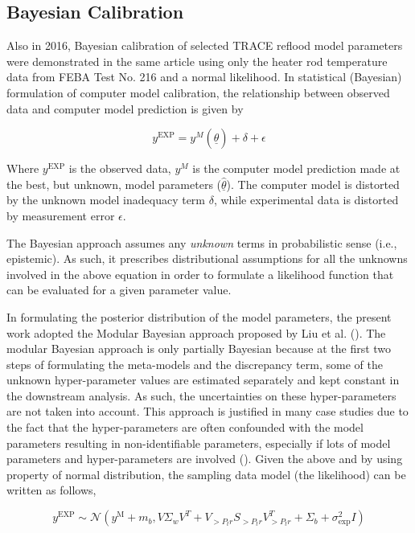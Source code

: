 \documentclass[11pt,titlepage]{article}
\begin{document}
\subsection{Bayesian Calibration}

Also in 2016, Bayesian calibration of selected TRACE reflood model parameters
were demonstrated in the same article \cite{Wicaksono2016} using only the heater 
rod temperature data from FEBA Test No. 216 and a normal likelihood. 
In statistical (Bayesian) formulation of computer model calibration, 
the relationship between observed data and computer model prediction is 
given by

\begin{equation}
	y^{\text{EXP}} = y^M (\underline{\hat{\theta}})+ \delta + \epsilon
\end{equation}

Where $y^\text{EXP}$ is the observed data, $y^M$  is the computer model 
prediction made at the best, but unknown, model parameters 
($\underline{\hat{\theta}}$). The computer model is distorted by the 
unknown model inadequacy term $\delta$, while experimental data is 
distorted by measurement error $\epsilon$.

The Bayesian approach assumes any \emph{unknown} terms in probabilistic 
sense (i.e., epistemic). 
As such, it prescribes distributional assumptions for all the unknowns 
involved in the above equation in order to formulate a likelihood function 
that can be evaluated for a given parameter value.

In formulating the posterior distribution of the model parameters, 
the present work adopted the Modular Bayesian approach proposed 
by Liu et al. (\cite{Liu2009}). 
The modular Bayesian approach is only partially Bayesian because 
at the first two steps of formulating the meta-models and the discrepancy 
term, some of the unknown hyper-parameter values are estimated separately 
and kept constant in the downstream analysis. 
As such, the uncertainties on these hyper-parameters are not taken into 
account. 
This approach is justified in many case studies due to the fact that the 
hyper-parameters are often confounded with the model parameters resulting 
in non-identifiable parameters, especially if lots of model parameters 
and hyper-parameters are involved (\cite{Liu2009,Bayarri2009}). 
Given the above and by using property of normal distribution, 
the sampling data model (the likelihood) can be written as follows,

\begin{equation}
    y^{\text{EXP}} \sim \mathcal{N}(y^\text{M} + m_b, V \Sigma_w V^T + V_{>P_tr} S_{>P_tr} V_{>P_tr}^T + \Sigma_b + \sigma_\text{exp}^2 I)
\end{equation}
\end{document}
